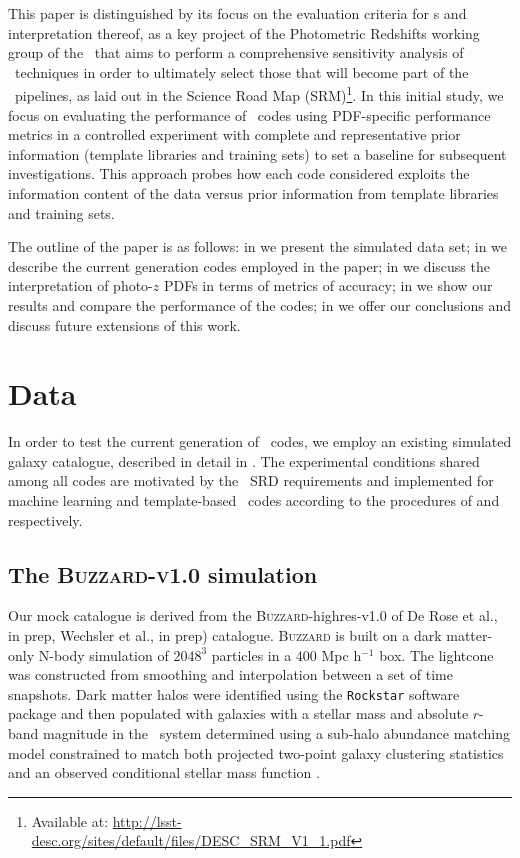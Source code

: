 This paper is distinguished by its focus on the evaluation criteria for \pzpdf s and interpretation thereof, as a key project of the Photometric Redshifts working group of the \desc\ that aims to perform a comprehensive sensitivity analysis of \pzpdf\ techniques in order to ultimately select those that will become part of the \lsst\ pipelines, as laid out in the Science Road Map (SRM)\footnote{Available at: \url{http://lsst-desc.org/sites/default/files/DESC_SRM_V1_1.pdf}\label{lsstdesc_srm}}.
In this initial study, we focus on evaluating the performance of \pzpdf\ codes using PDF-specific performance metrics in a controlled experiment with complete and representative prior information (template libraries and training sets) to set a baseline for subsequent investigations.
This approach probes how each code considered exploits the information content of the data versus prior information from template libraries and training sets.

The outline of the paper is as follows: in  we present the simulated data set; in  we describe the current generation codes employed in the paper; in  we discuss the interpretation of photo-$z$ PDFs in terms of metrics of accuracy; in  we show our results and compare the performance of the codes; in  we offer our conclusions and discuss future extensions of this work.

\section{Data}

In order to test the current generation of \pzpdf\ codes, we employ an existing simulated galaxy catalogue, described in detail in .
The experimental conditions shared among all codes are motivated by the \lsst\ SRD requirements and implemented for machine learning and template-based \pzpdf\ codes according to the procedures of  and  respectively.

\subsection{The \textsc{Buzzard-v1.0} simulation}

Our mock catalogue is derived from the \textsc{Buzzard}-highres-v1.0  of De Rose et al., in prep, Wechsler et al., in prep) catalogue.
\textsc{Buzzard} is built on a dark matter-only N-body simulation of $2048^{3}$ particles in a $400$ Mpc h$^{-1}$ box.
The lightcone was constructed from smoothing and interpolation between a set of time snapshots.
Dark matter halos were identified using the \texttt{Rockstar} software package \citep{Behroozi:13} and then populated with galaxies with a stellar mass and absolute $r$-band magnitude in the \sdss\ system determined using a sub-halo abundance matching model constrained to match both projected two-point galaxy clustering statistics and an observed conditional stellar mass function \citep{Reddick:13}.

